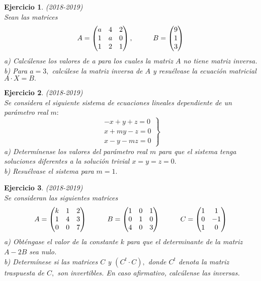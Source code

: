 \documentclass[12pt, a4paper]{amsart}
\newtheorem{ejer}{Ejercicio}
\begin{document}
\begin{ejer}\em (2018-2019)\\
Sean las matrices
\[A=\begin{pmatrix}
a & 4 & 2 
\\ 1 & a & 0
\\ 1 & 2 & 1
\end{pmatrix}, \hspace*{1cm} B=\begin{pmatrix}
9
\\ 1
\\3
\end{pmatrix}\]
a) Calcúlense los valores de a para los cuales la matriz $A$ no tiene matriz inversa.\\
b) Para $a = 3,$ calcúlese la matriz inversa de $A$ y resuélvase la ecuación matricial $A \cdot X = B.$
\end{ejer}

\begin{ejer}\em (2018-2019)\\
Se considera el siguiente sistema de ecuaciones lineales dependiente de un parámetro real $m:$
\[
\left. \begin{matrix}
-x+y+z=0
\\ x+my-z=0
\\  x-y-mz=0
\end{matrix}  \right \}
\]
a) Determínense los valores del parámetro real $m$ para que el sistema tenga soluciones diferentes a la solución trivial $x = y = z = 0.$\\
b) Resuélvase el sistema para $m = 1.$
\end{ejer}

\begin{ejer}\em (2018-2019)\\
Se consideran las siguientes matrices
\[A=\begin{pmatrix}
k & 1 & 2 
\\ 1 & 4 & 3
\\ 0 & 0 & 7
\end{pmatrix} \hspace*{1cm} B=\begin{pmatrix}
1 & 0 & 1
\\ 0 & 1 & 0
\\4 & 0 & 3
\end{pmatrix} \hspace*{1cm} C=\begin{pmatrix}
1 & 1
\\ 0 & -1
\\ 1 & 0
\end{pmatrix}\]
a) Obténgase el valor de la constante $k$ para que el determinante de la matriz $A - 2B$ sea nulo.\\
b) Determínese si las matrices $C$ y $(C^t \cdot C),$ donde $C^t$ denota la matriz traspuesta de $C,$ son invertibles. En caso afirmativo, calcúlense las inversas.
\end{ejer}
\end{document}
